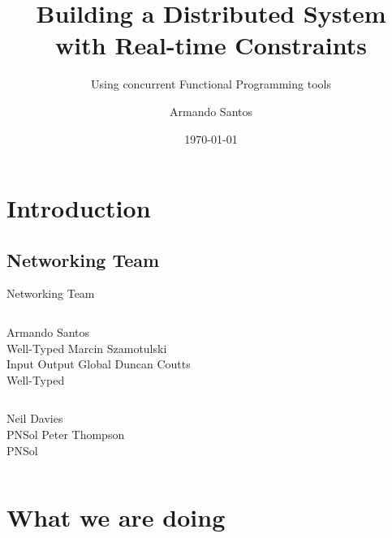 \documentclass{beamer}
\begin{document}
\title{Building a Distributed System with Real-time Constraints}
\subtitle{Using concurrent Functional Programming tools}
\author{Armando Santos}
\date{\today}
\maketitle


\section{Introduction}
\subsection*{Networking Team}
\begin{frame}{Networking Team}
  \begin{columns}
    \centering
    Armando Santos \\ Well-Typed
    \centering
    Marcin Szamotulski \\ Input Output Global
    \centering
    Duncan Coutts \\ Well-Typed
  \end{columns}
  \vskip1cm
  \begin{columns}
    \centering
    Neil Davies \\ PNSol
    \centering
    Peter Thompson \\ PNSol
  \end{columns}
\end{frame}

\section{What we are doing}
\end{document}
